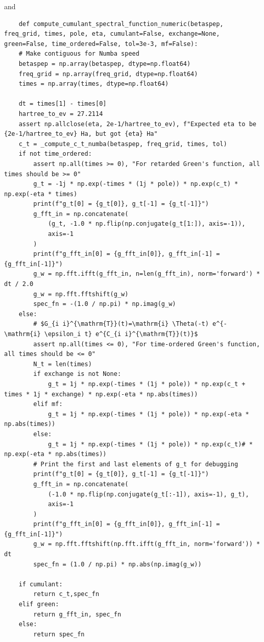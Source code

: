and
\begin{verbatim}
    def compute_cumulant_spectral_function_numeric(betaspep, freq_grid, times, pole, eta, cumulant=False, exchange=None, green=False, time_ordered=False, tol=3e-3, mf=False):
    # Make contiguous for Numba speed
    betaspep = np.array(betaspep, dtype=np.float64)
    freq_grid = np.array(freq_grid, dtype=np.float64)
    times = np.array(times, dtype=np.float64)

    dt = times[1] - times[0]
    hartree_to_ev = 27.2114
    assert np.allclose(eta, 2e-1/hartree_to_ev), f"Expected eta to be {2e-1/hartree_to_ev} Ha, but got {eta} Ha"
    c_t = _compute_c_t_numba(betaspep, freq_grid, times, tol)
    if not time_ordered:
        assert np.all(times >= 0), "For retarded Green's function, all times should be >= 0"
        g_t = -1j * np.exp(-times * (1j * pole)) * np.exp(c_t) * np.exp(-eta * times)
        print(f"g_t[0] = {g_t[0]}, g_t[-1] = {g_t[-1]}")
        g_fft_in = np.concatenate(
            (g_t, -1.0 * np.flip(np.conjugate(g_t[1:]), axis=-1)),
            axis=-1
        )
        print(f"g_fft_in[0] = {g_fft_in[0]}, g_fft_in[-1] = {g_fft_in[-1]}")
        g_w = np.fft.ifft(g_fft_in, n=len(g_fft_in), norm='forward') * dt / 2.0
        g_w = np.fft.fftshift(g_w)
        spec_fn = -(1.0 / np.pi) * np.imag(g_w)
    else:
        # $G_{i i}^{\mathrm{T}}(t)=\mathrm{i} \Theta(-t) e^{-\mathrm{i} \epsilon_i t} e^{C_{i i}^{\mathrm{T}}(t)}$
        assert np.all(times <= 0), "For time-ordered Green's function, all times should be <= 0"
        N_t = len(times)
        if exchange is not None:
            g_t = 1j * np.exp(-times * (1j * pole)) * np.exp(c_t + times * 1j * exchange) * np.exp(-eta * np.abs(times))
        elif mf:
            g_t = 1j * np.exp(-times * (1j * pole)) * np.exp(-eta * np.abs(times))
        else:
            g_t = 1j * np.exp(-times * (1j * pole)) * np.exp(c_t)# * np.exp(-eta * np.abs(times))
        # Print the first and last elements of g_t for debugging
        print(f"g_t[0] = {g_t[0]}, g_t[-1] = {g_t[-1]}")
        g_fft_in = np.concatenate(
            (-1.0 * np.flip(np.conjugate(g_t[:-1]), axis=-1), g_t),
            axis=-1
        )
        print(f"g_fft_in[0] = {g_fft_in[0]}, g_fft_in[-1] = {g_fft_in[-1]}")
        g_w = np.fft.fftshift(np.fft.ifft(g_fft_in, norm='forward')) * dt
        spec_fn = (1.0 / np.pi) * np.abs(np.imag(g_w))
        
    if cumulant:
        return c_t,spec_fn
    elif green:
        return g_fft_in, spec_fn
    else:
        return spec_fn
\end{verbatim}
